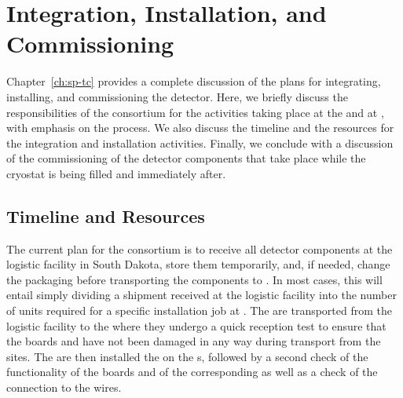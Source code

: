 \section{Integration, Installation, and Commissioning}
\label{sec:fdsp-tpcelec-integration}


Chapter~\ref{ch:sp-tc} provides a complete discussion of the plans for 
integrating, installing, and commissioning the detector.
Here, we briefly discuss the responsibilities of the 
consortium for the activities taking place at the
 and at , with emphasis on
the  process. We also discuss the timeline
and the resources for the integration and installation activities.
Finally, we conclude with a discussion of the commissioning
of the  detector components that take place while
the cryostat is being filled and immediately after. 

\subsection{Timeline and Resources}
\label{sec:fdsp-tpcelec-integration-timeline}

The current plan for the  consortium is to receive all detector 
components at the logistic facility in South Dakota, store them temporarily, 
and, if needed, change the packaging before transporting the components to 
. In most cases, this will entail simply dividing a shipment 
received at the logistic facility into the number of units required for a 
specific installation job at . The  are transported 
from the logistic facility to the  where they undergo
a quick reception test to ensure that the boards and  
have not been damaged in any way during transport from the  
 sites. The  are then installed the  
on the s, followed by a second check of the functionality of 
the boards and of the corresponding  as well as a check of 
the connection to the  wires. 

